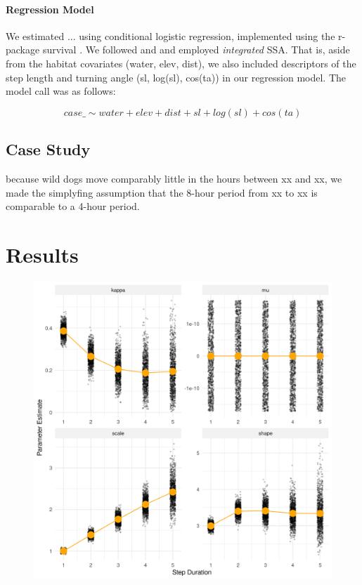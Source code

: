 \documentclass[abstract=on,10pt,a4paper,bibliography=totocnumbered]{article}
\begin{document}
\paragraph{Regression Model}
We estimated ... using conditional logistic regression, implemented using the
r-package \textsf{survival} \citep{Therneau.2021}. We followed \cite{Avgar.2016}
and \cite{Fieberg.2021} and employed \textit{integrated} SSA. That is, aside
from the habitat covariates (\textsf{water, elev, dist}), we also included
descriptors of the step length and turning angle (\textsf{sl, log(sl), cos(ta)})
in our regression model. The model call was as follows:

$$
case\_ \sim water + elev + dist + sl + log(sl) + cos(ta)
$$

\subsection{Case Study}

because wild dogs move comparably little in the hours between xx and xx, we made
the simplyfing assumption that the 8-hour period from xx to xx is comparable to
a 4-hour period.


\section{Results}

\begin{figure}
  \begin{center}
  \includegraphics[width = \textwidth]{99_DistributionParameters.png}
  \caption{}
  \label{DistributionParameters}
  \end{center}
\end{figure}
\end{document}
